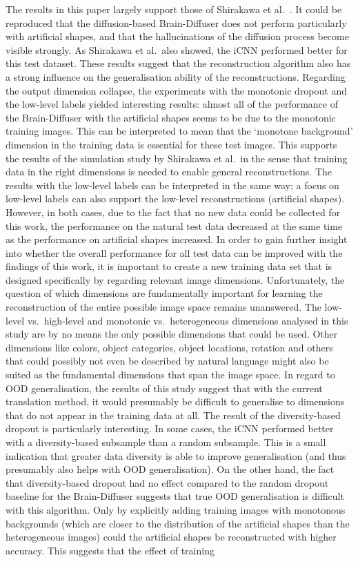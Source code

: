 The results in this paper largely support those of Shirakawa et al.~\cite{shirakawaSpuriousReconstructionBrain2024}. It could be reproduced that the diffusion-based Brain-Diffuser does not perform particularly  with artificial shapes, and that the hallucinations of the diffusion process become visible strongly. As Shirakawa et al.\ also showed, the iCNN performed better for this test dataset. These results suggest that the reconstruction algorithm also has a strong influence on the generalisation ability of the reconstructions. Regarding the output dimension collapse, the experiments with the monotonic dropout and the low-level labels yielded interesting results: almost all of the performance of the Brain-Diffuser with the artificial shapes seems to be due to the monotonic training images. This can be interpreted to mean that the `monotone background' dimension in the training data is essential for these test images. This supports the results of the simulation study by Shirakawa et al.\ in the sense that training data in the right dimensions is needed to enable general reconstructions. The results with the low-level labels can be interpreted in the same way; a focus on low-level labels can also support the low-level reconstructions (artificial shapes). However, in both cases, due to the fact that no new data could be collected for this work, the performance on the natural test data decreased at the same time as the performance on artificial shapes increased. In order to gain further insight into whether the overall performance for all test data can be improved with the findings of this work, it is important to create a new training data set that is designed specifically by regarding relevant image dimensions. Unfortunately, the question of which dimensions are fundamentally important for learning the reconstruction of the entire possible image space remains unanswered. The low-level vs.\ high-level and monotonic vs.\ heterogeneous dimensions analysed in this study are by no means the only possible dimensions that could be used. Other dimensions like colors, object categories, object locations, rotation and others that could possibly not even be described by natural language might also be suited  as the fundamental dimensions that span the image space. In regard to OOD generalisation, the results of this study suggest that with the current translation method, it would presumably be difficult to generalise to dimensions that do not appear in the training data at all. The result of the diversity-based dropout is particularly interesting. In some cases, the iCNN performed better with a diversity-based subsample than a random subsample. This is a small indication that greater data diversity is able to improve generalisation (and thus presumably also helps with OOD generalisation). On the other hand, the fact that diversity-based dropout had no effect compared to the random dropout baseline for the Brain-Diffuser suggests that true OOD generalisation is difficult with this algorithm. Only by explicitly adding training images with monotonous backgrounds (which are closer to the distribution of the artificial shapes than the heterogeneous images) could the artificial shapes be reconstructed with higher accuracy. This suggests that the effect of training 